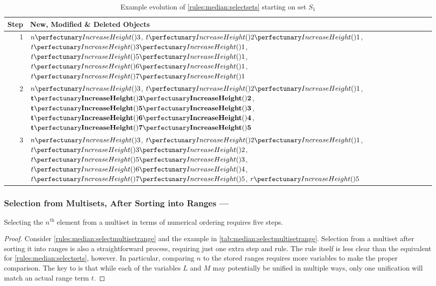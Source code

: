 \begin{table}[htbp]
\centering
   \begin{tabular}{|r|l|}
    \hline
    \textbf{Step} & \textbf{New, Modified \& Deleted Objects} \\ \hline
    1 & \(\cpfunc{n}{3}\), \(\cpfuncn{t}{2}{1}\), \(\cpfuncn{t}{3}{1}\), \(\cpfuncn{t}{5}{1}\), \(\cpfuncn{t}{6}{1}\), \(\cpfuncn{t}{7}{1}\)\\ \hline
    
    2 & \(\cpfunc{n}{3}\), \(\cpfuncn{t}{2}{1}\), \(\mathbf{\cpfuncn{t}{3}{2}}\), \(\mathbf{\cpfuncn{t}{5}{3}}\), \(\mathbf{\cpfuncn{t}{6}{4}}\), \(\mathbf{\cpfuncn{t}{7}{5}}\)\\ \hline
    
    3 & \(\cpfunc{n}{3}\), \(\cpfuncn{t}{2}{1}\), \(\cpfuncn{t}{3}{2}\), \(\cpfuncn{t}{5}{3}\), \(\cpfuncn{t}{6}{4}\), \(\cpfuncn{t}{7}{5}\), \(\cpfunc{r}{5}\)\\ \hline

\end{tabular} 
\caption[Example evolution of \cref{rules:median:selectsets} to select the \(n^{\text{th}}\) element in a set]{\label{tab:median:selectsets}Example evolution of \cref{rules:median:selectsets} starting on set \(S_1\)}
\end{table}

\subsubsection{Selection from Multisets, After Sorting into Ranges --- }\label{sec:median:selectmultisetrange}

\begin{proposition}\label{prop:median:selectmultisetrange}
Selecting the \(n^{\text{th}}\) element from a multiset in terms of numerical ordering requires five steps.
\end{proposition}

\begin{proof}
Consider \cref{rules:median:selectmultisetrange} and the example in \cref{tab:median:selectmultisetrange}.  Selection from a multiset after sorting it into ranges is also a straightforward process, requiring just one extra step and rule.  The rule itself is less clear than the equivalent for \cref{rules:median:selectsets}, however.  In particular, comparing \(n\) to the stored ranges requires more variables to make the proper comparison.  The key to  is that while each of the variables \(L\) and \(M\) may potentially be unified in multiple ways, only one unification will match an actual range term \(t\).  
\end{proof}

